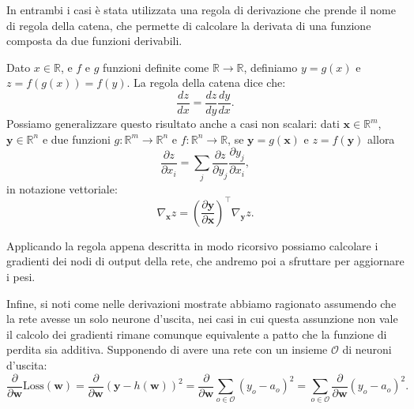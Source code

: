 \documentclass[../../main.tex]{subfiles}
\begin{document}
In entrambi i casi è stata utilizzata una regola di derivazione che prende il nome di regola della catena, che permette di calcolare la derivata di una funzione composta da due funzioni derivabili.

Dato $x \in \mathbb{R}$, e $f$ e $g$ funzioni definite come $\mathbb{R} \rightarrow \mathbb{R}$, definiamo $y = g(x)$ e $z = f(g(x)) = f(y)$. La regola della catena dice che:
\[\frac{dz}{dx} = \frac{dz}{dy} \frac{dy}{dx}.\]
Possiamo generalizzare questo risultato anche a casi non scalari: dati $\boldsymbol{x} \in \mathbb{R}^m$, $\boldsymbol{y} \in \mathbb{R}^n$ e due funzioni $g: \mathbb{R}^m \rightarrow \mathbb{R}^n$ e $f: \mathbb{R}^n \rightarrow \mathbb{R}$, se $\boldsymbol{y} = g(\boldsymbol{x})$ e $z = f(\boldsymbol{y})$ allora
\[\frac{\partial z}{\partial x_i} = \sum_j \frac{\partial z}{\partial y_j} \frac{\partial y_j}{\partial x_i},\]
in notazione vettoriale:
\[\nabla_{\boldsymbol{x}} z = \left(\frac{\partial \boldsymbol{y}}{\partial \boldsymbol{x}}\right)^\top \nabla_{\boldsymbol{y}} z.\]

Applicando la regola appena descritta in modo ricorsivo possiamo calcolare i gradienti dei nodi di output della rete, che andremo poi a sfruttare per aggiornare i pesi. 

Infine, si noti come nelle derivazioni mostrate abbiamo ragionato assumendo che la rete avesse un solo neurone d'uscita, nei casi in cui questa assunzione non vale il calcolo dei gradienti rimane comunque equivalente a patto che la funzione di perdita sia additiva. Supponendo di avere una rete con un insieme $\mathcal{O}$ di neuroni d'uscita:
\[\frac{\partial}{\partial \boldsymbol{w}} \mathrm{Loss}(\boldsymbol{w}) = \frac{\partial}{\partial \boldsymbol{w}} (\boldsymbol{y} - h(\boldsymbol{w}))^2 = \frac{\partial}{\partial \boldsymbol{w}} \sum_{o \in \mathcal{O}} (y_o - a_o) ^ 2 = \sum_{o \in \mathcal{O}} \frac{\partial}{\partial \boldsymbol{w}} (y_o - a_o) ^ 2.\]
\end{document}
